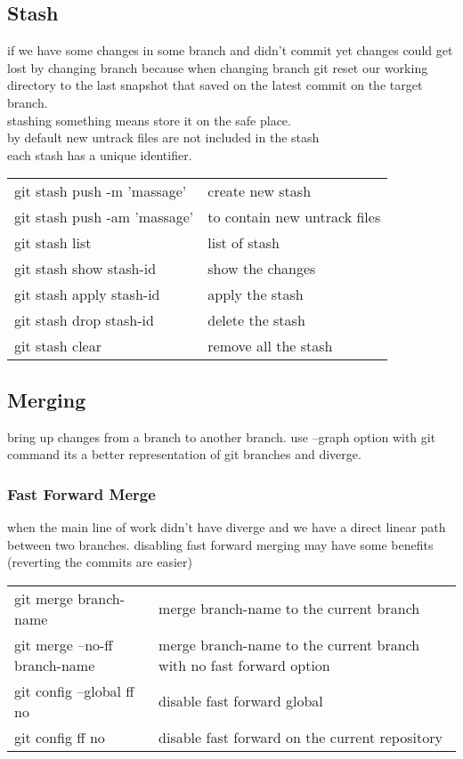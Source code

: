 \documentclass{article}
\begin{document}
	\subsection{Stash}
		if we have some changes in some branch and didn't commit yet changes could get lost by changing branch because when changing branch
		git reset our working directory to the last snapshot that saved on the latest commit on the target branch.\\
		stashing something means store it on the safe place.\\
		by default new untrack files are not included in the stash \\
		each stash has a unique identifier.\\
		\begin{tabular}{l l}
			git stash push -m 'massage'  & create new stash             \\
			git stash push -am 'massage' & to contain new untrack files \\
			git stash list               & list of stash                \\
			git stash show stash-id      & show the changes             \\
			git stash apply stash-id     & apply the stash              \\
			git stash drop stash-id      & delete the stash             \\
			git stash clear              & remove all the stash
		\end{tabular}
	
	\subsection{Merging}
		bring up changes from a branch to another branch.
		use --graph option with git command its a better representation of git branches and diverge.
		
		\subsubsection{Fast Forward Merge}
			when the main line of work didn't have diverge and we have a direct linear path between two branches.
			disabling fast forward merging may have some benefits (reverting the commits are easier)\\
			\begin{tabular}{l l}
				git merge branch-name         & merge branch-name to the current branch                             \\
				git merge --no-ff branch-name & merge branch-name to the current branch with no fast forward option \\
				git config --global ff no     & disable fast forward global                                         \\
				git config ff no              & disable fast forward on the current repository
			\end{tabular}
\end{document}
